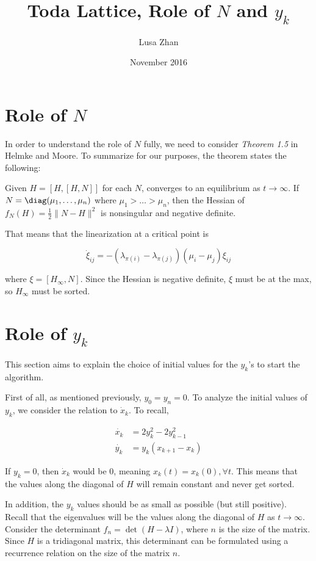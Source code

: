 \documentclass{article}
\title{Toda Lattice, Role of $N$ and $y_k$}
\author{Lusa Zhan}
\date{November 2016}
\begin{document}
\maketitle

\section{Role of $N$}
In order to understand the role of $N$ fully, we need to consider \textit{Theorem 1.5} in Helmke and Moore. To summarize for our purposes, the theorem states the following: 

Given $H = [H,[H,N]]$ for each $N$, converges to an equilibrium as $t\rightarrow \infty$. If $N=\diag (\mu_1 , \dots , \mu_n)$ where $\mu_1 > \dots > \mu_n$, then the Hessian of $f_N(H) = \frac{1}{2}\|N-H\|^2$ is nonsingular and negative definite. 

That means that the linearization at a critical point is 

\[\dot \xi_{ij} = -(\lambda_{\pi(i)}-\lambda_{\pi(j)})(\mu_i-\mu_j)\xi_{ij}\]

where $\xi = [H_\infty, N]$. Since the Hessian is negative definite, $\xi$ must be at the max, so $H_\infty$ must be sorted. 



\section{Role of $y_k$}
This section aims to explain the choice of initial values for the $y_k$'s to start the algorithm.

First of all, as mentioned previously, $y_0=y_n=0$.
To analyze the initial values of $y_k$, we consider the relation to $\dot x_k$. To recall, 

\begin{align*}
    \dot{x_k} &=  2y^2_k-2y^2_{k-1} \\
    \dot{y_k} &= y_k(x_{k+1}-x_k) 
\end{align*}

If $y_k=0$, then $\dot x_k$ would be 0, meaning $x_k(t) = x_k(0), \forall t$. This means that the values along the diagonal of $H$ will remain constant and never get sorted. 

In addition, the $y_k$ values should be as small as possible (but still positive). Recall that the eigenvalues will be the values along the diagonal of $H$ as $t\rightarrow \infty$. Consider the determinant $f_n = \det (H-\lambda I)$, where $n$ is the size of the matrix. Since $H$ is a tridiagonal matrix, this determinant can be formulated using a recurrence relation on the size of the matrix $n$.
\end{document}
